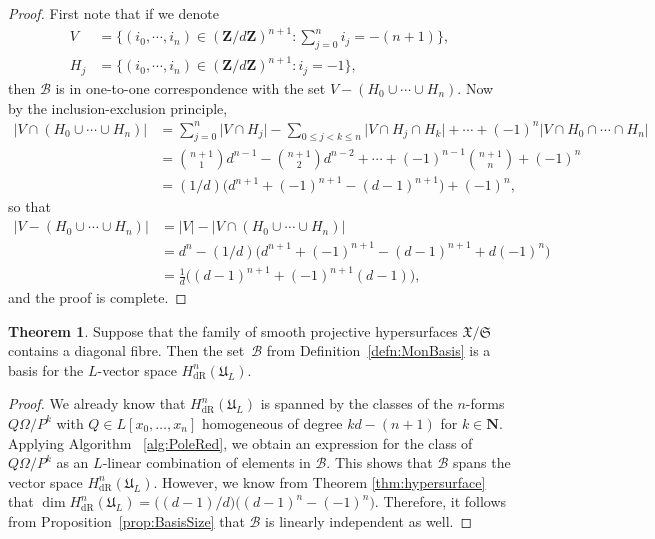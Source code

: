 \documentclass[a4paper,11pt]{article}
\numberwithin{equation}{section}
\providecommand{\abs}[1]{\lvert#1\rvert}                 %
\newcommand{\NN}{\mathbf{N}} %
\newcommand{\ZZ}{\mathbf{Z}} %
\providecommand{\HdR}{H_{\text{dR}}}    %
\providecommand{\cB}{\mathcal{B}} %
\theoremstyle{definition}
\newtheorem{thm}{Theorem}[section]
\begin{document}
\begin{proof}
First note that if we denote
\begin{align*}
V &= \{(i_0,\cdots,i_n) \in (\ZZ/d\ZZ)^{n+1} : \sum_{j=0}^n i_j = -(n+1)\}, \\
H_j &= \{(i_0,\cdots,i_n) \in (\ZZ/d\ZZ)^{n+1} : i_j = -1 \},
\end{align*}
then  $\cB$ is in one-to-one correspondence with the set $V-(H_0 \cup \cdots \cup H_n)$. Now by the inclusion-exclusion
principle, 
\begin{align*}
\abs{V \cap (H_0 \cup \cdots \cup H_n)} &= \sum_{j=0}^n \abs{V \cap H_j} - \sum_{0 \leq j < k \leq n} \abs{V \cap H_j \cap H_k}
+ \cdots + (-1)^{n} \abs{V \cap H_0 \cap \cdots \cap H_n} \\
&= {n+1 \choose 1} d^{n-1} -{n+1 \choose 2} d^{n-2} + \cdots + (-1)^{n-1} {n+1 \choose n} + (-1)^{n} \\
&= (1/d)\bigl(d^{n+1}+(-1)^{n+1} - (d-1)^{n+1}\bigr)+(-1)^n,
\end{align*}
so that
\begin{align*}
\abs{V-(H_0 \cup \cdots \cup H_n)}&=\abs{V}-\abs{V \cap (H_0 \cup \cdots \cup H_n)} \\
&= d^n - (1/d)\bigl(d^{n+1}+(-1)^{n+1} - (d-1)^{n+1}+d (-1)^n \bigr) \\
&= \frac{1}{d} \bigl((d-1)^{n+1} + (-1)^{n+1}(d-1) \bigr),
\end{align*}
and the proof is complete.
\end{proof}

\begin{thm} \label{thm:Basis}
Suppose that the family of smooth projective hypersurfaces $\mathfrak{X}/\mathfrak{S}$ 
contains a diagonal fibre.  Then the set~$\cB$ from Definition~\ref{defn:MonBasis} 
is a basis for the $L$-vector space $\HdR^n(\mathfrak{U}_L)$.
\end{thm}

\begin{proof}
We already know that $\HdR^n(\mathfrak{U}_L)$ is spanned by the classes of the 
$n$-forms $Q \Omega / P^k$ with $Q \in L[x_0, \dotsc, x_n]$ homogeneous of degree 
$kd - (n+1)$ for $k \in \NN$. Applying Algorithm ~\ref{alg:PoleRed}, we obtain an 
expression for the class of $Q \Omega / P^k$ as an $L$-linear combination of 
elements in $\cB$.  This shows that $\cB$ spans the vector space 
$\HdR^n(\mathfrak{U}_L)$. However, we know from Theorem \ref{thm:hypersurface} that 
$\dim \HdR^n(\mathfrak{U}_L) = \bigl((d-1)/d\bigr) \bigl( (d-1)^n - (-1)^n \bigr)$.  
Therefore, it follows from Proposition~\ref{prop:BasisSize} that $\cB$ is linearly 
independent as well.
\end{proof}
\end{document}
